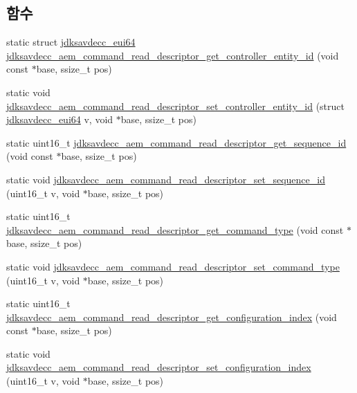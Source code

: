 \subsection*{함수}
\begin{DoxyCompactItemize}
\item 
static struct \hyperlink{structjdksavdecc__eui64}{jdksavdecc\+\_\+eui64} \hyperlink{group__command__read__descriptor_gabced69855a3c6775489f97a6b27d9ef4}{jdksavdecc\+\_\+aem\+\_\+command\+\_\+read\+\_\+descriptor\+\_\+get\+\_\+controller\+\_\+entity\+\_\+id} (void const $\ast$base, ssize\+\_\+t pos)
\item 
static void \hyperlink{group__command__read__descriptor_gaa81214e399f36a9475929dac3d74838f}{jdksavdecc\+\_\+aem\+\_\+command\+\_\+read\+\_\+descriptor\+\_\+set\+\_\+controller\+\_\+entity\+\_\+id} (struct \hyperlink{structjdksavdecc__eui64}{jdksavdecc\+\_\+eui64} v, void $\ast$base, ssize\+\_\+t pos)
\item 
static uint16\+\_\+t \hyperlink{group__command__read__descriptor_gadbc2e7ea5813be32f666268896add041}{jdksavdecc\+\_\+aem\+\_\+command\+\_\+read\+\_\+descriptor\+\_\+get\+\_\+sequence\+\_\+id} (void const $\ast$base, ssize\+\_\+t pos)
\item 
static void \hyperlink{group__command__read__descriptor_ga85164c1e057bdf1320378f348da2c56c}{jdksavdecc\+\_\+aem\+\_\+command\+\_\+read\+\_\+descriptor\+\_\+set\+\_\+sequence\+\_\+id} (uint16\+\_\+t v, void $\ast$base, ssize\+\_\+t pos)
\item 
static uint16\+\_\+t \hyperlink{group__command__read__descriptor_gaad2b202c52c5cd36d6500077acc6a8d1}{jdksavdecc\+\_\+aem\+\_\+command\+\_\+read\+\_\+descriptor\+\_\+get\+\_\+command\+\_\+type} (void const $\ast$base, ssize\+\_\+t pos)
\item 
static void \hyperlink{group__command__read__descriptor_ga48d8f644a8cfa4adcf158f130e95f17c}{jdksavdecc\+\_\+aem\+\_\+command\+\_\+read\+\_\+descriptor\+\_\+set\+\_\+command\+\_\+type} (uint16\+\_\+t v, void $\ast$base, ssize\+\_\+t pos)
\item 
static uint16\+\_\+t \hyperlink{group__command__read__descriptor_ga0891905ce973732e8e344a90479dc123}{jdksavdecc\+\_\+aem\+\_\+command\+\_\+read\+\_\+descriptor\+\_\+get\+\_\+configuration\+\_\+index} (void const $\ast$base, ssize\+\_\+t pos)
\item 
static void \hyperlink{group__command__read__descriptor_gac20be52fc55cb44ec61878ce7e45daaf}{jdksavdecc\+\_\+aem\+\_\+command\+\_\+read\+\_\+descriptor\+\_\+set\+\_\+configuration\+\_\+index} (uint16\+\_\+t v, void $\ast$base, ssize\+\_\+t pos)

\end{DoxyCompactItemize}
